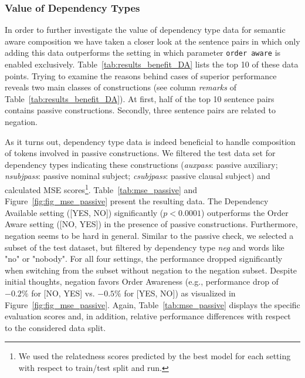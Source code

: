 
\subsubsection{Value of Dependency Types}
In order to further investigate the value of dependency type data for semantic aware composition we have taken a closer look at the sentence pairs in which only adding this data outperforms the setting in which parameter \texttt{order aware} is enabled exclusively. Table~\ref{tab:results_benefit_DA} lists the top 10 of these data points. Trying to examine the reasons behind cases of superior performance reveals two main classes of constructions (see column \textit{remarks} of Table~\ref{tab:results_benefit_DA}). At first, half of the top 10 sentence pairs contains passive constructions. Secondly, three sentence pairs are related to negation. 

As it turns out, dependency type data is indeed beneficial to handle composition of tokens involved in passive constructions. We filtered the test data set for dependency types indicating these constructions (\textit{auxpass}: passive auxiliary; \textit{nsubjpass}: passive nominal subject; \textit{csubjpass}: passive clausal subject) and calculated \ac{MSE} scores\footnote{We used the relatedness scores predicted by the best model for each setting with respect to train/test split and run.}. Table~\ref{tab:mse_passive} and Figure~\ref{fig:fig_mse_passive} present the resulting data. The Dependency Available setting ([YES, NO]) significantly ($p < 0.0001$) outperforms the Order Aware setting ([NO, YES]) in the presence of passive constructions. Furthermore, negation seems to be hard in general. Similar to the passive check, we selected a subset of the test dataset, but filtered by dependency type \textit{neg} and words like "no" or "nobody". For all four settings, the performance dropped significantly when switching from the subset without negation to the negation subset. Despite initial thoughts, negation favors Order Awareness (e.g., performance drop of $-0.2\%$ for [NO, YES] vs. $-0.5\%$ for [YES, NO]) as visualized in Figure~\ref{fig:fig_mse_passive}. Again, Table~\ref{tab:mse_passive} displays the specific evaluation scores and, in addition, relative performance differences with respect to the considered data split.

